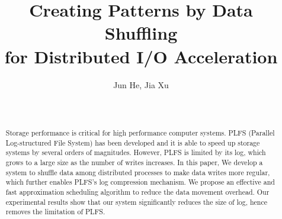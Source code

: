 \documentclass{acm_proc_article-sp}
\begin{document}
\title{Creating Patterns by Data Shuffling \\for Distributed I/O Acceleration
}

%
%
%
%
%

%
\author{
\alignauthor
Jun He, Jia Xu\\
       \\
       \\
}

\maketitle
\begin{abstract}
Storage performance is critical for high
performance computer systems. PLFS (Parallel
Log-structured File System) has been developed
and it is able to speed up storage systems by
several orders of magnitudes. However, PLFS
is limited by its log, which grows to a
large size as the number of writes increases.
In this paper, We develop a system to shuffle data among distributed
processes to make data writes more regular,
which further enables PLFS's log compression
mechanism. We propose an effective and fast 
approximation scheduling algorithm to reduce 
the data movement overhead.
Our experimental results show that our 
system significantly reduces
the size of log, hence removes the
limitation of PLFS.
\end{abstract}
\end{document}
